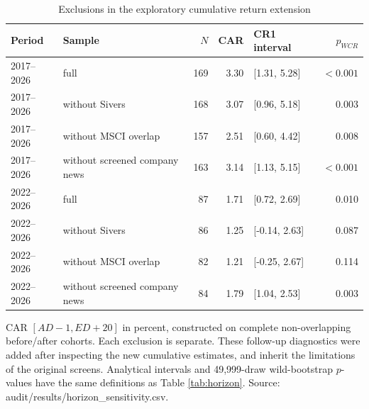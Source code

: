 \begin{table}[!htbp]
\centering
\caption{Exclusions in the exploratory cumulative return extension}\label{tab:horizon_checks}
\small
\setlength{\tabcolsep}{5pt}
\begin{tabular}{llrrlr}
\toprule
Period & Sample & $N$ & CAR & CR1 interval & $p_{WCR}$ \\
\midrule
2017--2026 & full & 169 & 3.30 & [1.31, 5.28] & $<0.001$ \\
2017--2026 & without Sivers & 168 & 3.07 & [0.96, 5.18] & 0.003 \\
2017--2026 & without MSCI overlap & 157 & 2.51 & [0.60, 4.42] & 0.008 \\
2017--2026 & without screened company news & 163 & 3.14 & [1.13, 5.15] & $<0.001$ \\
2022--2026 & full & 87 & 1.71 & [0.72, 2.69] & 0.010 \\
2022--2026 & without Sivers & 86 & 1.25 & [-0.14, 2.63] & 0.087 \\
2022--2026 & without MSCI overlap & 82 & 1.21 & [-0.25, 2.67] & 0.114 \\
2022--2026 & without screened company news & 84 & 1.79 & [1.04, 2.53] & 0.003 \\
\bottomrule
\end{tabular}
\begin{minipage}{\linewidth}\footnotesize\vspace{5pt}
CAR $[AD-1,ED+20]$ in percent, constructed on complete non-overlapping before/after cohorts. Each exclusion is separate. These follow-up diagnostics were added after inspecting the new cumulative estimates, and inherit the limitations of the original screens. Analytical intervals and 49,999-draw wild-bootstrap $p$-values have the same definitions as Table \ref{tab:horizon}. Source: audit/results/horizon\_sensitivity.csv.
\end{minipage}
\end{table}
